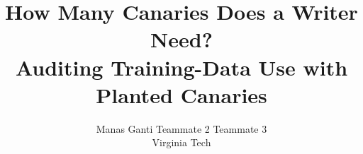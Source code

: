 \documentclass{article}
\title{How Many Canaries Does a Writer Need?\\Auditing Training-Data Use with Planted Canaries}
\author{%
  Manas Ganti \And Teammate 2 \And Teammate 3 \\
  Virginia Tech \\
  \todo{names, emails}
}
\begin{document}
\maketitle

\begin{abstract}

\end{abstract}












\appendix

\end{document}
